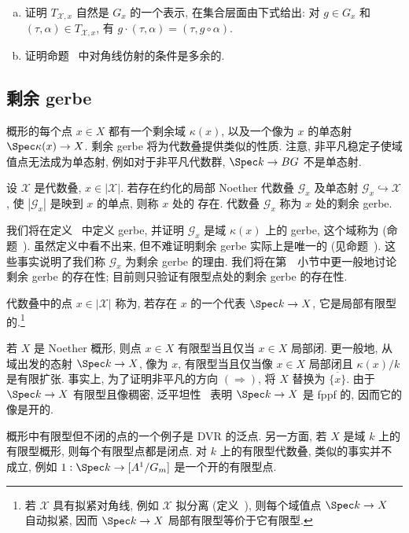 \begin{exercise}[较难]\label{src:4.5.11}
\begin{enumerate}[(a)]
\item 证明 $T_{\mathcal X,x}$ 自然是 $G_x$ 的一个表示, 在集合层面由下式给出: 对 $g\in G_x$ 和 $(\tau,\alpha)\in T_{\mathcal X,x}$, 有 $g\cdot(\tau,\alpha)=(\tau,g\circ\alpha)$.
\item 证明命题~ 中对角线仿射的条件是多余的.
\end{enumerate}
\end{exercise}
\subsection{剩余 gerbe}\label{src:4.5.3-subsection}
概形的每个点 $x\in X$ 都有一个剩余域 $\kappa(x)$, 以及一个像为 $x$ 的单态射 $\Spec\kappa(x)\to X$. 剩余 gerbe 将为代数叠提供类似的性质. 注意, 非平凡稳定子使域值点无法成为单态射, 例如对于非平凡代数群, $\Spec k\to BG$ 不是单态射.
\begin{definition}\label{src:4.5.12}
设 $\mathcal X$ 是代数叠, $x\in|\mathcal X|$. 若存在约化的局部 Noether 代数叠 $\mathcal G_x$ 及单态射 $\mathcal G_x\hookrightarrow\mathcal X$, 使 $|\mathcal G_x|$ 是映到 $x$ 的单点, 则称 $x$ 处的 存在. 代数叠 $\mathcal G_x$ 称为 $x$ 处的剩余 gerbe.
\end{definition}
我们将在定义~ 中定义 gerbe, 并证明 $\mathcal G_x$ 是域 $\kappa(x)$ 上的 gerbe, 这个域称为 (命题~). 虽然定义中看不出来, 但不难证明剩余 gerbe 实际上是唯一的 (见命题~). 这些事实说明了我们称 $\mathcal G_x$ 为剩余 gerbe 的理由. 我们将在第~~小节中更一般地讨论剩余 gerbe 的存在性; 目前则只验证有限型点处的剩余 gerbe 的存在性.
\begin{definition}\label{src:4.5.13}
代数叠中的点 $x\in|\mathcal X|$ 称为, 若存在 $x$ 的一个代表 $\Spec k\to\mathcal X$, 它是局部有限型的.\footnote{若 $\mathcal X$ 具有拟紧对角线, 例如 $\mathcal X$ 拟分离 (定义~), 则每个域值点 $\Spec k\to\mathcal X$ 自动拟紧, 因而 $\Spec k\to\mathcal X$ 局部有限型等价于它有限型.}
\end{definition}
\begin{remark}\label{src:4.5.14}
若 $X$ 是 Noether 概形, 则点 $x\in X$ 有限型当且仅当 $x\in X$ 局部闭. 更一般地, 从域出发的态射 $\Spec k\to X$, 像为 $x$, 有限型当且仅当像 $x\in X$ 局部闭且 $\kappa(x)/k$ 是有限扩张. 事实上, 为了证明非平凡的方向 $(\Rightarrow)$, 将 $X$ 替换为 $\overline{\{x\}}$. 由于 $\Spec k\to X$ 有限型且像稠密, 泛平坦性~ 表明 $\Spec k\to X$ 是 fppf 的, 因而它的像是开的.

概形中有限型但不闭的点的一个例子是 DVR 的泛点. 另一方面, 若 $X$ 是域 $k$ 上的有限型概形, 则每个有限型点都是闭点. 对 $k$ 上的有限型代数叠, 类似的事实并不成立, 例如 $1:\Spec k\to[\mathbb A^1/\mathbb G_m]$ 是一个开的有限型点.
\end{remark}
